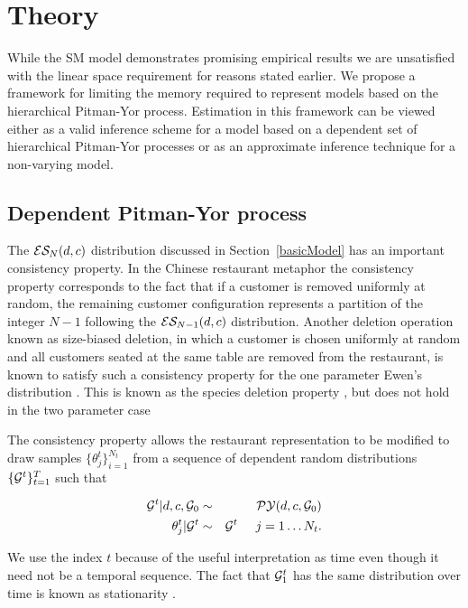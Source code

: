 \section{Theory}

While the SM model demonstrates promising empirical results \cite{Gasthaus} we are unsatisfied with the linear space requirement for reasons stated earlier.  We propose a framework for limiting the memory required to represent models based on the hierarchical Pitman-Yor process.  Estimation in this framework can be viewed either as a valid inference scheme for a model based on a dependent set of hierarchical Pitman-Yor processes or as an approximate inference technique for a non-varying model.

\subsection{Dependent Pitman-Yor process} 

The $\ES_N(d,c)$ distribution discussed in Section~\ref{basicModel} has an important consistency property. In the Chinese restaurant metaphor the consistency property corresponds to the fact that if a customer is removed uniformly at random, the remaining customer configuration represents a partition of the integer $N-1$ following the $\ES_{N-1}(d,c)$ distribution. Another deletion operation known as size-biased deletion, in which a customer is chosen uniformly at random and all customers seated at the same table are removed from the restaurant, is known to satisfy such a consistency property for the one parameter Ewen's distribution \cite{kingman}.  This is known as the species deletion property \cite{kingman}, but does not hold in the two parameter case \cite{pitman}

The consistency property allows the restaurant representation to be modified to draw samples  $\{ \theta_j^t \}_{i = 1}^{N_t}$ from a sequence of dependent random distributions $\{ \G^t \}_{t=1}^T$ such that 

\begin{eqnarray}
 \label{eqnDependentPY1}  \G^t | d, c, \G_0 &\sim& \PY(d,c,\G_0)\\
 \label{eqnDependentPY2}  \theta_j^t | \G^t &\sim& \G^t \hspace{.5cm} j = 1 \dots N_t.
 \end{eqnarray}
 
We use the index $t$ because of the useful interpretation as time even though it need not be a temporal sequence. The fact that $\G^t_1$ has the same distribution over time is known as stationarity \cite{davis and brockwel}.  
 
